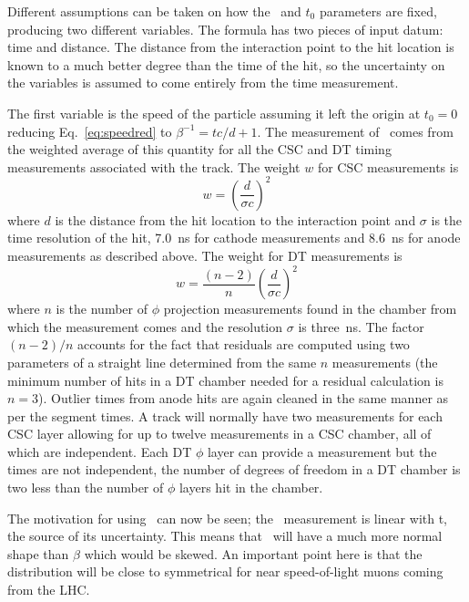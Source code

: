Different assumptions can be taken on how the \invbeta\ and $t_0$ parameters are fixed, producing two different variables.
The formula has two pieces of input datum: time and distance. The distance
from the interaction point to the hit location is known to a much better degree than the time of the hit, so the uncertainty on the variables
is assumed to come entirely from the time measurement.

The first variable is the speed of the particle assuming it left the origin at $t_0 = 0$ reducing Eq.~\ref{eq:speedred} to 
$\beta^{-1} = tc/d + 1$. The measurement of \invbeta\ comes from the weighted average of this quantity for all the
CSC and DT timing measurements associated with the track.
The weight $w$ for CSC measurements is
\begin{equation}
w = \left(\frac{d}{\sigma c}\right)^2
 \label{betaweight}
\end{equation}
where $d$ is the distance from the hit location to the interaction point
and $\sigma$ is the time resolution of the hit, 7.0~ns for cathode measurements and 8.6~ns for anode measurements as described above.
The weight for DT measurements is 
\begin{equation}
 w = \frac{(n-2)}{n}\left(\frac{d}{\sigma c}\right)^2
\end{equation}
where $n$ is the number of $\phi$ projection measurements found in the
chamber from which the measurement comes and the resolution $\sigma$ is three~ns.
The factor ${(n-2)/n}$ accounts for the fact that residuals are computed
using two parameters of a straight line determined from the same
$n$ measurements (the minimum number of hits in a DT chamber
needed for a residual calculation is $n=3$).
Outlier times from anode hits are again cleaned in the same manner as per the segment times. 
A track will normally have two measurements for each CSC layer allowing for up to twelve measurements in a CSC chamber, all of which are independent.
Each DT $\phi$ layer can provide a measurement but the times are not independent, the number of degrees of freedom in a DT chamber is two less than the number of $\phi$ layers
hit in the chamber.

The motivation for using \invbeta\ can now be seen; the \invbeta\ measurement
is linear with t, the source of its uncertainty. This means that \invbeta\ will have a much more normal shape than $\beta$ which would be skewed.
An important point here is that the distribution will be close to symmetrical for near speed-of-light muons coming from the LHC.

